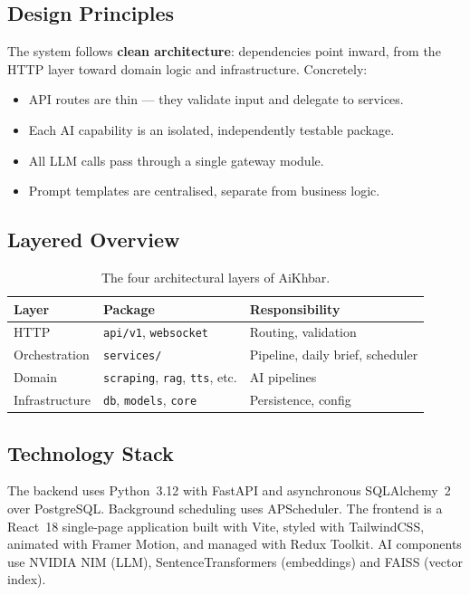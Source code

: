 \documentclass[11pt,a4paper]{article}
\begin{document}
\subsection{Design Principles}
The system follows \textbf{clean architecture}: dependencies point inward, from
the HTTP layer toward domain logic and infrastructure. Concretely:
\begin{itemize}[noitemsep]
  \item API routes are thin --- they validate input and delegate to services.
  \item Each AI capability is an isolated, independently testable package.
  \item All LLM calls pass through a single gateway module.
  \item Prompt templates are centralised, separate from business logic.
\end{itemize}

\subsection{Layered Overview}
\begin{table}[h]
\centering
\begin{tabular}{@{}lll@{}}
\toprule
\textbf{Layer} & \textbf{Package} & \textbf{Responsibility} \\
\midrule
HTTP          & \texttt{api/v1}, \texttt{websocket} & Routing, validation \\
Orchestration & \texttt{services/} & Pipeline, daily brief, scheduler \\
Domain        & \texttt{scraping}, \texttt{rag}, \texttt{tts}, etc. & AI pipelines \\
Infrastructure& \texttt{db}, \texttt{models}, \texttt{core} & Persistence, config \\
\bottomrule
\end{tabular}
\caption{The four architectural layers of AiKhbar.}
\end{table}

\subsection{Technology Stack}
The backend uses Python~3.12 with FastAPI and asynchronous SQLAlchemy~2 over
PostgreSQL. Background scheduling uses APScheduler. The frontend is a React~18
single-page application built with Vite, styled with TailwindCSS, animated with
Framer Motion, and managed with Redux Toolkit. AI components use NVIDIA NIM
(LLM), SentenceTransformers (embeddings) and FAISS (vector index).
\end{document}
